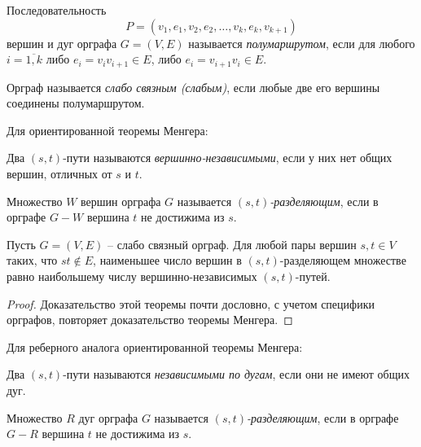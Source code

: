 \begin{definition}[Полумаршрут]
    Последовательность
    \[
        P = (v_1,e_1,v_2,e_2,\ldots,v_k,e_k,v_{k+1})
    \]
    вершин и дуг орграфа $ G = (V,E) $ называется \emph{полумаршрутом}, если для любого $ i = \overline{1,k} $ либо $ e_i = v_iv_{i+1}\in E $, либо $ e_i = v_{i+1}v_i \in E $.
\end{definition}

\begin{definition}
    Орграф называется \emph{слабо связным (слабым)}, если любые две его вершины соединены полумаршрутом.
\end{definition}

\begin{note} Для ориентированной теоремы Менгера:
    \begin{definition}
        Два $ (s,t) $-пути называются \emph{вершинно-независимыми}, если у них нет общих вершин, отличных от $ s $ и $ t $.
    \end{definition}

    \begin{definition}
        Множество $ W $ вершин орграфа $ G $ называется \emph{$ (s,t) $-разделяющим}, если в орграфе $ G-W $ вершина $ t $ не достижима из $ s $.
    \end{definition}
\end{note}

\begin{theorem}
    Пусть $ G = (V,E) $ -- слабо связный орграф. Для любой пары вершин $ s,t \in V $ таких, что $ st \notin E $, наименьшее число вершин в $ (s,t) $-разделяющем множестве равно наибольшему числу вершинно-независимых $ (s,t) $-путей.
\end{theorem}

\begin{proof}
    Доказательство этой теоремы почти дословно, с учетом специфики орграфов, повторяет доказательство теоремы Менгера.
\end{proof}

\begin{note} Для реберного аналога ориентированной теоремы Менгера:
    \begin{definition}
        Два $ (s,t) $-пути называются \emph{независимыми по дугам}, если они не имеют общих дуг.
    \end{definition}

    \begin{definition}
        Множество $ R $ дуг орграфа $ G $ называется \emph{$ (s,t) $-разделяющим}, если в орграфе $ G - R $ вершина $ t $ не достижима из $ s $.
    \end{definition}
\end{note}

